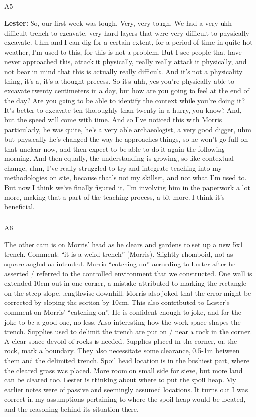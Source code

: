 \documentclass[
]{article}
\makeatletter
\let\oldsubparagraph\subparagraph
\renewcommand{\subparagraph}{
    \@ifstar
      \xxxSubParagraphStar
      \xxxSubParagraphNoStar
  }
\newcommand{\xxxSubParagraphStar}[1]{\oldsubparagraph*{#1}\mbox{}}
\newcommand{\xxxSubParagraphNoStar}[1]{\oldsubparagraph{#1}\mbox{}}
\makeatother
\begin{document}
\subparagraph{A5}\label{sec-A5}

\textbf{Lester:} So, our first week was tough. Very, very tough. We had
a very uhh difficult trench to excavate, very hard layers that were very
difficult to physically excavate. Uhm and I can dig for a certain
extent, for a period of time in quite hot weather, I'm used to this, for
this is not a problem. But I see people that have never approached this,
attack it physically, really really attack it physically, and not bear
in mind that this is actually really difficult. And it's not a
physicality thing, it's a, it's a thought process. So it's uhh, yes
you're physically able to excavate twenty centimeters in a day, but how
are you going to feel at the end of the day? Are you going to be able to
identify the context while you're doing it? It's better to excavate ten
thoroughly than twenty in a hurry, you know? And, but the speed will
come with time. And so I've noticed this with Morris particularly, he
was quite, he's a very able archaeologist, a very good digger, uhm but
physically he's changed the way he approaches things, so he won't go
full-on that unclear now, and then expect to be able to do it again the
following morning. And then equally, the understanding is growing, so
like contextual change, uhm, I've really struggled to try and integrate
teaching into my methodologies on site, because that's not my skillset,
and not what I'm used to. But now I think we've finally figured it, I'm
involving him in the paperwork a lot more, making that a part of the
teaching process, a bit more. I think it's beneficial.

\subparagraph{A6}\label{sec-A6}

The other cam is on Morris' head as he clears and gardens to set up a
new 5x1 trench. Comment: ``it is a weird trench'' (Morris). Slightly
rhomboid, not as square-angled as intended. Morris ``catching on''
according to Lester after he asserted / referred to the controlled
environment that we constructed. One wall is extended 10cm out in one
corner, a mistake attributed to marking the rectangle on the steep
slope, lengthwise downhill. Morris also joked that the error might be
corrected by sloping the section by 10cm. This also contributed to
Lester's comment on Morris' ``catching on''. He is confident enough to
joke, and for the joke to be a good one, no less. Also interesting how
the work space shapes the trench. Supplies used to delimit the trench
are put on / near a rock in the corner. A clear space devoid of rocks is
needed. Supplies placed in the corner, on the rock, mark a boundary.
They also necessitate some clearance, 0.5-1m between them and the
delimited trench. Spoil head location is in the bushiest part, where the
cleared grass was placed. More room on small side for sieve, but more
land can be cleared too. Lester is thinking about where to put the spoil
heap. My earlier notes were of passive and seemingly assumed locations.
It turns out I was correct in my assumptions pertaining to where the
spoil heap would be located, and the reasoning behind its situation
there.
\end{document}
